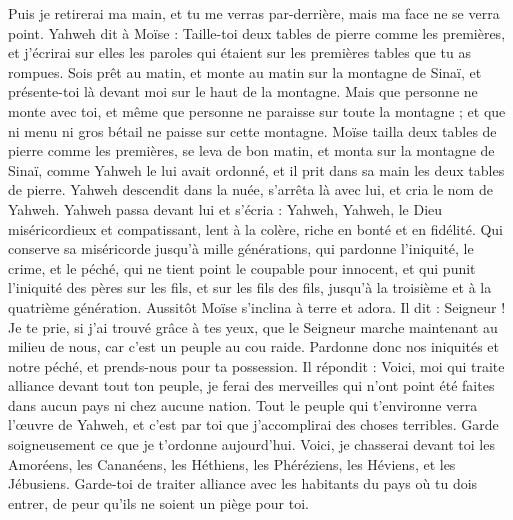 \begin{multicols}{2}
Puis je retirerai ma main, et tu me verras par-derrière, mais ma face ne se verra point.
\VerseOne{}Yahweh dit à Moïse : Taille-toi deux tables de pierre comme les premières, et j'écrirai sur elles les paroles qui étaient sur les premières tables que tu as rompues.
Sois prêt au matin, et monte au matin sur la montagne de Sinaï, et présente-toi là devant moi sur le haut de la montagne.
Mais que personne ne monte avec toi, et même que personne ne paraisse sur toute la montagne ; et que ni menu ni gros bétail ne paisse sur cette montagne.
Moïse tailla deux tables de pierre comme les premières, se leva de bon matin, et monta sur la montagne de Sinaï, comme Yahweh le lui avait ordonné, et il prit dans sa main les deux tables de pierre.
Yahweh descendit dans la nuée, s'arrêta là avec lui, et cria le nom de Yahweh.
Yahweh passa devant lui et s’écria : Yahweh, Yahweh, le Dieu miséricordieux et compatissant, lent à la colère, riche en bonté et en fidélité.
Qui conserve sa miséricorde jusqu’à mille générations, qui pardonne l'iniquité, le crime, et le péché, qui ne tient point le coupable pour innocent, et qui punit l'iniquité des pères sur les fils, et sur les fils des fils, jusqu’à la troisième et à la quatrième génération.
Aussitôt Moïse s’inclina à terre et adora.
Il dit : Seigneur ! Je te prie, si j'ai trouvé grâce à tes yeux, que le Seigneur marche maintenant au milieu de nous, car c'est un peuple au cou raide. Pardonne donc nos iniquités et notre péché, et prends-nous pour ta possession.
Il répondit : Voici, moi qui traite alliance devant tout ton peuple, je ferai des merveilles qui n'ont point été faites dans aucun pays ni chez aucune nation. Tout le peuple qui t’environne verra l'œuvre de Yahweh, et c’est par toi que j’accomplirai des choses terribles.
Garde soigneusement ce que je t’ordonne aujourd'hui. Voici, je chasserai devant toi les Amoréens, les Cananéens, les Héthiens, les Phéréziens, les Héviens, et les Jébusiens.
Garde-toi de traiter alliance avec les habitants du pays où tu dois entrer, de peur qu’ils ne soient un piège pour toi.

\end{multicols}
